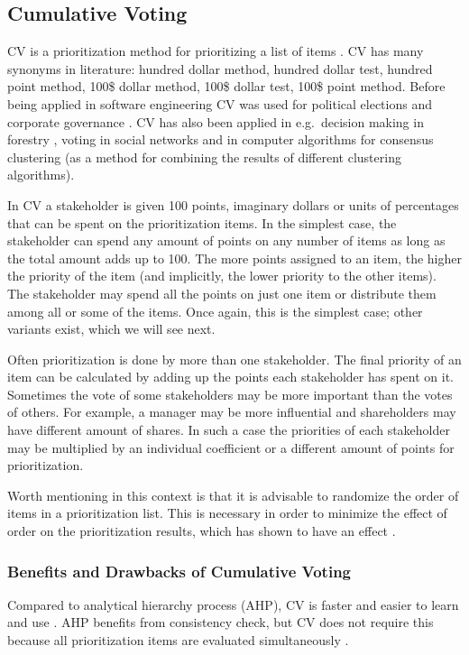 

\subsection{Cumulative Voting\label{app:CV}}

CV is a prioritization method for prioritizing a list of items \citep{Leffingwell1999}.
CV has many synonyms in literature: hundred dollar method, hundred
dollar test, hundred point method, 100\$ dollar method, 100\$ dollar
test, 100\$ point method.
Before being applied in software engineering CV was used for
political elections \citep{Engstrom1999} and corporate governance
\citep{Bhagat1984}. CV has also been applied in e.g.\ decision making in forestry
\citep{Hiltunen2008}, voting in social networks \citep{Boldi:2009:VSN:1645953.1646052} and in computer algorithms for consensus clustering \citep{Ayad2008b} (as a method for combining the results of different clustering algorithms).

In CV a stakeholder is given 100 points,
imaginary dollars or units of percentages that can be spent on the prioritization
items. In the simplest case, the stakeholder can spend any amount of points on any number
of items as long as the total amount adds up to 100. The more points
assigned to an item, the higher the priority of the item (and implicitly, 
the lower priority to the other items). The
stakeholder may spend all the points on just one item or distribute
them among all or some of the items. Once again, this is the simplest case; other variants exist, which we will see next.

Often prioritization is done by more than one stakeholder. The final
priority of an item can be calculated by adding up the points each stakeholder
has spent on it. Sometimes the vote of some stakeholders may be more
important than the votes of others. For example, a manager may be
more influential and shareholders may have different
amount of shares. In such a case the priorities of each stakeholder
may be multiplied by an individual coefficient or a different amount of 
points for prioritization.

Worth mentioning in this context is that it is advisable to randomize 
the order of items in a prioritization list. This is necessary in order 
to minimize the effect of order on the prioritization
results, which has shown to have an effect \citep{Svahnberg2009}.

\subsubsection{Benefits and Drawbacks of Cumulative Voting}
Compared to analytical hierarchy process (AHP), CV is faster and easier to 
learn and use \citep{Berander2005,Ahl2005}.
AHP benefits from consistency check, but CV does not require this because
all prioritization items are evaluated simultaneously \citep{Ahl2005}.

